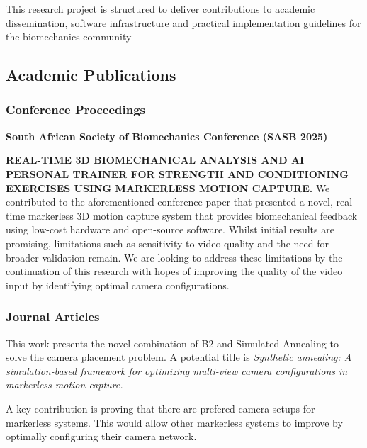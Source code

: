 \renewcommand{\labelenumii}{\arabic{enumi}.\arabic{enumii}}
\renewcommand{\labelenumiii}{\arabic{enumi}.\arabic{enumii}.\arabic{enumiii}}
\renewcommand{\labelenumiv}{\arabic{enumi}.\arabic{enumii}.\arabic{enumiii}.\arabic{enumiv}}

\label{chap:Anticipated Outputs}

\label{sec:background}

This research project is structured to deliver contributions to academic dissemination, software infrastructure and practical implementation guidelines for the biomechanics community
\subsection{Academic Publications}

\subsubsection{Conference Proceedings}

\textbf{South African Society of Biomechanics Conference (SASB 2025)}

\textbf{REAL-TIME 3D BIOMECHANICAL ANALYSIS AND AI PERSONAL TRAINER FOR STRENGTH AND
CONDITIONING EXERCISES USING MARKERLESS MOTION CAPTURE.
}
We contributed to the aforementioned conference paper that presented a novel, real-time markerless
3D motion capture system that provides biomechanical
feedback using low-cost hardware and open-source
software. Whilst initial results are promising, limitations such
as sensitivity to video quality and the need for
broader validation remain. 
We are looking to address these limitations by the continuation of this research with hopes of improving the quality of the video input by identifying optimal camera configurations.


\subsubsection{Journal Articles}

This work presents the novel combination of B2 and Simulated Annealing to solve the camera placement problem. A potential title is \textit{Synthetic annealing: A simulation-based framework for optimizing multi-view camera configurations in markerless motion capture.}

A key contribution is proving that there are prefered camera setups for markerless systems. This would allow other markerless systems to improve by optimally configuring their camera network.

